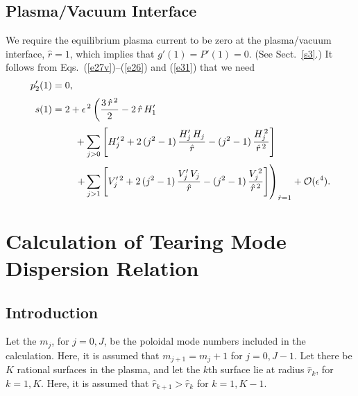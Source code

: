 \documentclass[12pt,prb,aps]{revtex4-1}
\begin{document}
\subsection{Plasma/Vacuum Interface}
We require the equilibrium plasma current to be zero at the plasma/vacuum interface, $\hat{r}=1$, which
implies that $g'(1)=P'(1)= 0$. (See Sect.~\ref{s3}.) It follows from Eqs.~(\ref{e27v})--(\ref{e26}) and (\ref{e31}) that we need\,\cite{am1}
\begin{align}
p_2'(1) &= 0,\label{e222}\\[0.5ex]
s(1) &= 2+ \epsilon^{\,2}\left(\frac{3\,\hat{r}^{\,2}}{2}-2\,\hat{r}\,H_1'\right.\nonumber\\[0.5ex]
&\phantom{===}
+\sum_{j>0}\left[H_j'^{\,2}+2\,(j^2-1)\,\frac{H_j'\,H_j}{\hat{r}}-(j^2-1)\,\frac{H_j^{\,2}}{\hat{r}^{\,2}}\right]\nonumber\\[0.5ex]
&\phantom{===}\left.+\sum_{j>1}\left[V_j'^{\,2}+2\,(j^2-1)\,\frac{V_j'\,V_j}{\hat{r}}-(j^2-1)\,\frac{V_j^{\,2}}{\hat{r}^{\,2}}\right]\right)_{\hat{r}=1}
+{\cal O}(\epsilon^4).\label{e223}
\end{align}

\section{Calculation of  Tearing Mode Dispersion Relation}\label{etm}
\subsection{Introduction}
Let the $m_j$, for $j=0,J$, be the poloidal mode numbers included in the calculation. Here, it is assumed that $m_{j+1}=m_j+1$ for $j=0,J-1$. 
Let there be $K$ rational surfaces in the plasma, and let the $k$th surface lie at radius $\hat{r}_k$, for $k=1,K$. Here,
it is assumed that $\hat{r}_{k+1}>\hat{r}_k$ for $k=1,K-1$. 
\end{document}
